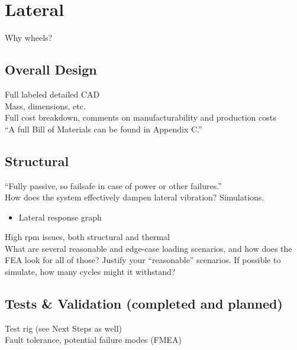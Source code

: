 \documentclass[main.tex]{subfile}
\begin{document}
    \section{Lateral}
    Why wheels?

    \subsection{Overall Design}
    Full labeled detailed CAD\\
    Mass, dimensions, etc.\\
    Full cost breakdown, comments on manufacturability and production costs\\
    “A full Bill of Materials can be found in Appendix C.”

    \subsection{Structural}
    “Fully passive, so failsafe in case of power or other failures.”\\
    How does the system effectively dampen lateral vibration? Simulations.\\
    \begin{itemize}
        \item Lateral response graph
    \end{itemize}
    High rpm issues, both structural and thermal\\
    What are several reasonable and edge-case loading scenarios, and how does the FEA look for all of those? Justify your “reasonable” scenarios. If possible to simulate, how many cycles might it withstand?

    \subsection{Tests \& Validation (completed and planned)}
    Test rig (see Next Steps as well)\\
    Fault tolerance, potential failure modes (FMEA)
\end{document}
